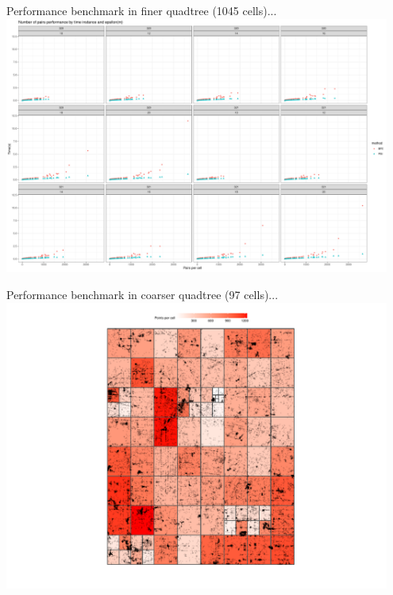 \documentclass{beamer}
\begin{document}
\begin{frame}{Performance benchmark in finer quadtree (1045 cells)...}
    \centering
    \includegraphics[width=0.95\textwidth]{figures/psi_pairs}
\end{frame}


\begin{frame}{Performance benchmark in coarser quadtree (97 cells)...}
    \centering
    \includegraphics[width=0.95\textwidth]{figures/coarser/points_per_cell}
\end{frame}
\end{document}
